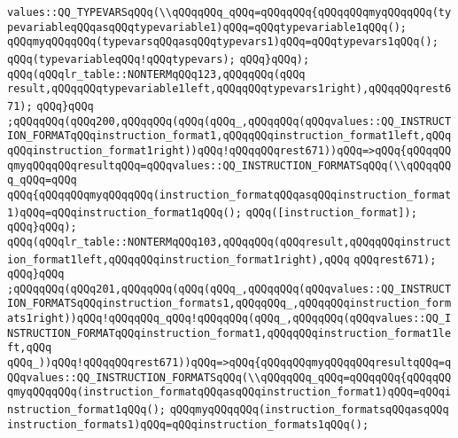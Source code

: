 \verb|values::QQ_TYPEVARSqQQq(\\qQQqqQQq_qQQq=qQQqqQQq{qQQqqQQqmyqQQqqQQq(typevariableqQQqasqQQqtypevariable1)qQQq=qQQqtypevariable1qQQq();|\newline
\verb|qQQqmyqQQqqQQq(typevarsqQQqasqQQqtypevars1)qQQq=qQQqtypevars1qQQq();|\newline
\verb|qQQq(typevariableqQQq!qQQqtypevars);|\newline
\verb|qQQq}qQQq);|\newline
\verb|qQQq(qQQqlr_table::NONTERMqQQq123,qQQqqQQq(qQQq|\newline
\verb|result,qQQqqQQqtypevariable1left,qQQqqQQqtypevars1right),qQQqqQQqrest671);|\newline
\verb|qQQq}qQQq|\newline
\verb|;qQQqqQQq(qQQq200,qQQqqQQq(qQQq(qQQq_,qQQqqQQq(qQQqvalues::QQ_INSTRUCTION_FORMATqQQqinstruction_format1,qQQqqQQqinstruction_format1left,qQQqqQQqinstruction_format1right))qQQq!qQQqqQQqrest671))qQQq=>qQQq{qQQqqQQqmyqQQqqQQqresultqQQq=qQQqvalues::QQ_INSTRUCTION_FORMATSqQQq(\\qQQqqQQq_qQQq=qQQq|\newline
\verb|qQQq{qQQqqQQqmyqQQqqQQq(instruction_formatqQQqasqQQqinstruction_format1)qQQq=qQQqinstruction_format1qQQq();|\newline
\verb|qQQq([instruction_format]);|\newline
\verb|qQQq}qQQq);|\newline
\verb|qQQq(qQQqlr_table::NONTERMqQQq103,qQQqqQQq(qQQqresult,qQQqqQQqinstruction_format1left,qQQqqQQqinstruction_format1right),qQQq|\newline
\verb|qQQqrest671);|\newline
\verb|qQQq}qQQq|\newline
\verb|;qQQqqQQq(qQQq201,qQQqqQQq(qQQq(qQQq_,qQQqqQQq(qQQqvalues::QQ_INSTRUCTION_FORMATSqQQqinstruction_formats1,qQQqqQQq_,qQQqqQQqinstruction_formats1right))qQQq!qQQqqQQq_qQQq!qQQqqQQq(qQQq_,qQQqqQQq(qQQqvalues::QQ_INSTRUCTION_FORMATqQQqinstruction_format1,qQQqqQQqinstruction_format1left,qQQq|\newline
\verb|qQQq_))qQQq!qQQqqQQqrest671))qQQq=>qQQq{qQQqqQQqmyqQQqqQQqresultqQQq=qQQqvalues::QQ_INSTRUCTION_FORMATSqQQq(\\qQQqqQQq_qQQq=qQQqqQQq{qQQqqQQqmyqQQqqQQq(instruction_formatqQQqasqQQqinstruction_format1)qQQq=qQQqinstruction_format1qQQq();|\newline
\verb|qQQqmyqQQqqQQq(instruction_formatsqQQqasqQQq|\newline
\verb|instruction_formats1)qQQq=qQQqinstruction_formats1qQQq();|\newline
